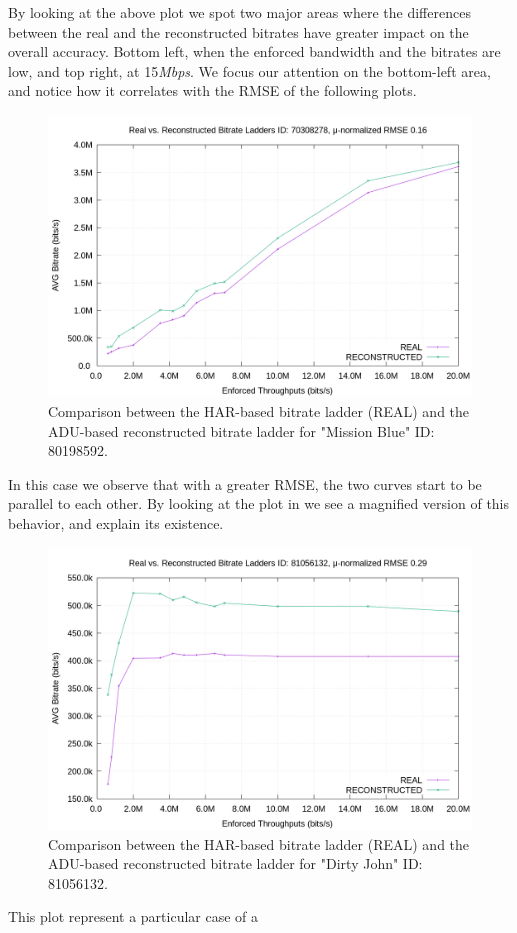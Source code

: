 By looking at the above plot we spot two major areas where the differences
between the real and the reconstructed bitrates have greater impact on the
overall accuracy. Bottom left, when the enforced bandwidth and the bitrates are
low, and top right, at 15\emph{Mbps}. We focus our attention on the bottom-left
area, and notice how it correlates with the RMSE of the following plots.

\newpage
\begin{figure}[!h]
  \centering
  \includegraphics[width=\columnwidth]{img/70308278}
  \caption{Comparison between the HAR-based bitrate ladder (REAL) and the
  ADU-based reconstructed bitrate ladder for "Mission Blue" ID: 80198592.}
  \label{fig:bl_comparison_good_2}
\end{figure}

In this case we observe that with a greater RMSE, the two curves start to be
parallel to each other. By looking at the plot in 
we see a magnified version of this behavior, and explain its existence.

\begin{figure}[!h]
  \centering
  \includegraphics[width=\columnwidth]{img/81056132.png}
  \caption{Comparison between the HAR-based bitrate ladder (REAL) and the
  ADU-based reconstructed bitrate ladder for "Dirty John" ID: 81056132.}
  \label{fig:bl_comparison_bad}
\end{figure}

This plot represent a particular case of a


